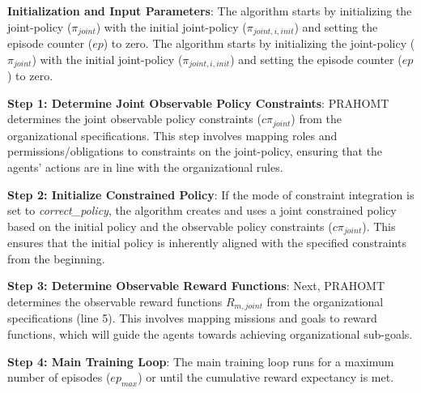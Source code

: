 \documentclass[conference]{IEEEtran}
\begin{document}
\textbf{Initialization and Input Parameters}: \quad
The algorithm starts by initializing the joint-policy ($\pi_{joint}$) with the initial joint-policy ($\pi_{joint,i,init}$) and setting the episode counter ($ep$) to zero.
The algorithm starts by initializing the joint-policy ($\pi_{joint}$) with the initial joint-policy ($\pi_{joint,i,init}$) and setting the episode counter ($ep$) to zero.

\textbf{Step 1: Determine Joint Observable Policy Constraints}: \quad
PRAHOMT determines the joint observable policy constraints ($c\pi_{joint}$) from the organizational specifications. This step involves mapping roles and permissions/obligations to constraints on the joint-policy, ensuring that the agents' actions are in line with the organizational rules.

\textbf{Step 2: Initialize Constrained Policy}: \quad
If the mode of constraint integration is set to \textit{correct\_policy}, the algorithm creates and uses a joint constrained policy based on the initial policy and the observable policy constraints ($c\pi_{joint}$). This ensures that the initial policy is inherently aligned with the specified constraints from the beginning.

\textbf{Step 3: Determine Observable Reward Functions}: \quad
Next, PRAHOMT determines the observable reward functions $R_{m,joint}$ from the organizational specifications (line 5). This involves mapping missions and goals to reward functions, which will guide the agents towards achieving organizational sub-goals.

\textbf{Step 4: Main Training Loop}: \quad
The main training loop runs for a maximum number of episodes ($ep_{max}$) or until the cumulative reward expectancy is met.
\end{document}
